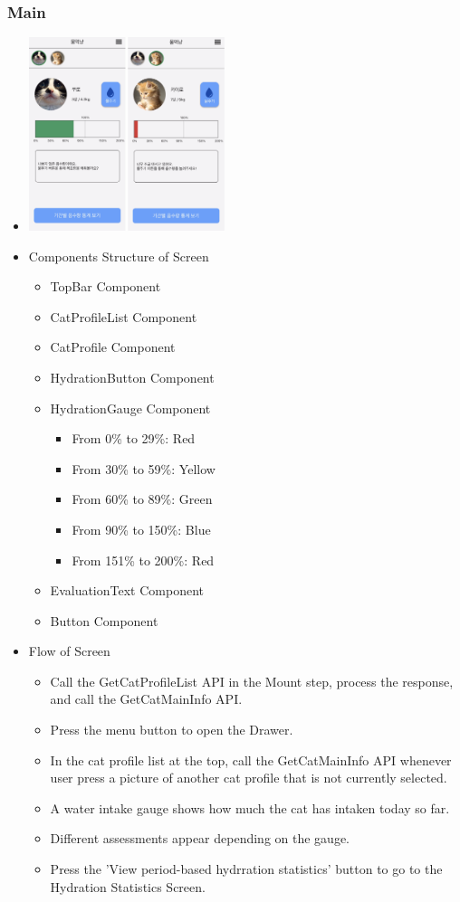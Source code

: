 \documentclass[conference]{IEEEtran}
\begin{document}
\subsubsection{Main}
\begin{itemize}
    \item[] \includegraphics[width=0.45\textwidth]{img/Screen/14_Main.png}
    \item Components Structure of Screen
    \begin{itemize}
        \item TopBar Component
        \item CatProfileList Component
        \item CatProfile Component
        \item HydrationButton Component
        \item HydrationGauge Component
        \begin{itemize}
            \item From 0\% to 29\%: Red
            \item From 30\% to 59\%: Yellow
            \item From 60\% to 89\%: Green
            \item From 90\% to 150\%: Blue
            \item From 151\% to 200\%: Red
        \end{itemize}
        \item EvaluationText Component
        \item Button Component
    \end{itemize}
    \item Flow of Screen
    \begin{itemize}
        \item Call the GetCatProfileList API in the Mount step, process the response, and call the GetCatMainInfo API.
        \item Press the menu button to open the Drawer.
        \item In the cat profile list at the top, call the GetCatMainInfo API whenever user press a picture of another cat profile that is not currently selected.
        \item A water intake gauge shows how much the cat has intaken today so far.
        \item Different assessments appear depending on the gauge.
        \item Press the 'View period-based hydrration statistics' button to go to the Hydration Statistics Screen.
    \end{itemize}
\end{itemize}
\newpage
\end{document}
